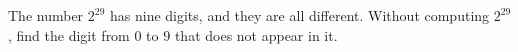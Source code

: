 The number $2^{29}$ has nine digits, and they are all different. Without computing $2^{29}$, find the digit from $0$ to $9$ that does not appear in it.
